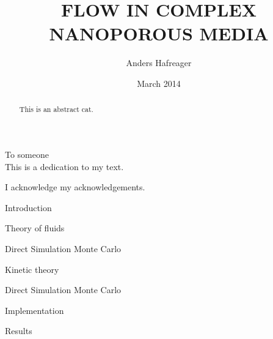\documentclass[twoside,english, a4paper, 10pt]{uiofysmaster}
\author{Anders Hafreager}
\title{\uppercase{Flow in complex nanoporous media}}
\date{March 2014}
\begin{document}
\maketitle
\clearpage

\begin{abstract}
This is an abstract cat.
\end{abstract}
\begin{dedication}
To someone
\\\vspace{12pt}
This is a dedication to my text.
\end{dedication}
\begin{acknowledgements}
  I acknowledge my acknowledgements.
\end{acknowledgements}

\tableofcontents
\clearpage
\listoffigures
\clearpage
\listoftables

\begin{chapter}{Introduction}
  
\end{chapter}

\begin{chapter}{Theory of fluids}
  \label{chap:theory_of_fluids}
  
  
  
\end{chapter}

\begin{part}{Direct Simulation Monte Carlo}
\begin{chapter}{Kinetic theory}
  \label{chap:kinetic_theory}
  
  
  
  
\end{chapter}

\begin{chapter}{Direct Simulation Monte Carlo}
  \label{chap:dsmc}
  
  
  
  
  
  
  
  
\end{chapter}
\begin{chapter}{Implementation}
\label{chap:dsmc_implementation}
  
  
  
  
  
\end{chapter}
\begin{chapter}{Results}
  \label{chap:dsmc_results}
  
  
\end{chapter}
\end{part}
\end{document}
